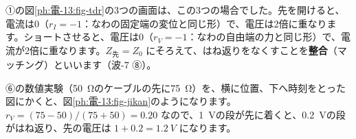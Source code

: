 \begin{phflow}[電圧の反射係数]
\end{phflow}
\label{ph:電-13:seigou}①の図\ref{ph:電-13:fig-tdr}の3つの画面は、この3つの場合でした。先を開けると、電流は0（$r_I=-1$：なわの固定端の変位と同じ形）で、電圧は2倍に重なります。ショートさせると、電圧は0（$r_V=-1$：なわの自由端の力と同じ形）で、電流が2倍に重なります。$Z_{\text{先}}=Z_0$ にそろえて、はね返りをなくすことを\textbf{整合}（マッチング）といいます（波-7 ⑧）。

⑥の数値実験（\qty{50}{\ohm}のケーブルの先に\qty{75}{\ohm}）を、横に位置、下へ時刻をとった図にかくと、図\ref{ph:電-13:fig-jikan}のようになります。$r_V=(75-50)/(75+50)=0.20$ なので、\qty{1}{V}の段が先に着くと、\qty{0.2}{V}の段がはね返り、先の電圧は $1+0.2=\qty{1.2}{V}$ になります。

